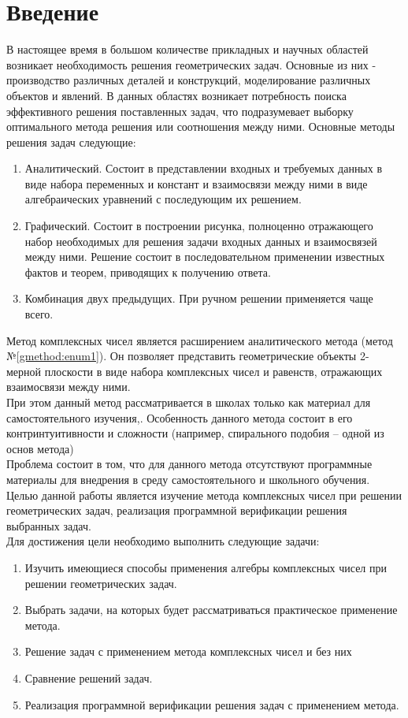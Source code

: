\documentclass[oneside,final,14pt]{extreport}
\newcommand\tcchapter[1]{%
  \chapter*{#1}%
  \addcontentsline{toc}{chapter}{#1}}
\begin{document}

\thispagestyle{empty}
\clearpage

\tableofcontents

\tcchapter{Введение}
В настоящее время в большом количестве прикладных и научных областей возникает необходимость решения геометрических задач.
Основные из них - производство различных деталей и конструкций, моделирование различных объектов и явлений.
В данных областях возникает потребность поиска эффективного решения поставленных задач, что подразумевает выборку оптимального метода решения или соотношения между ними. Основные методы решения задач следующие\cite{geom:methods}:
\begin{enumerate}
    \item Аналитический. Состоит в представлении входных и требуемых данных в виде набора переменных и констант и взаимосвязи между ними в виде алгебраических уравнений с последующим их решением. \label{gmethod:enum1}
    \item Графический. Состоит в построении рисунка, полноценно отражающего набор необходимых для решения задачи входных данных и взаимосвязей между ними. Решение состоит в последовательном применении известных фактов и теорем, приводящих к получению ответа.
    \item Комбинация двух предыдущих. При ручном решении применяется чаще всего.
\end{enumerate}
Метод комплексных чисел является расширением аналитического метода (метод №\ref{gmethod:enum1}).
Он позволяет представить геометрические объекты 2-мерной плоскости в виде набора комплексных чисел и равенств, отражающих взаимосвязи между ними.\\
При этом данный метод рассматривается в школах только как материал для самостоятельного изучения\cite{edu:problem},\cite[стр.6]{book:ponarin}. Особенность данного метода состоит в его контринтуитивности и сложности (например, спирального подобия -- одной из основ метода)\\
Проблема состоит в том, что для данного метода отсутствуют программные материалы для внедрения в среду самостоятельного и школьного обучения.\\
Целью данной работы является изучение метода комплексных чисел при решении геометрических задач, реализация программной верификации решения выбранных задач.\\
Для достижения цели необходимо выполнить следующие задачи:
\begin{enumerate}
    \item Изучить имеющиеся способы применения алгебры комплексных чисел при решении геометрических задач.
    \item Выбрать задачи, на которых будет рассматриваться практическое применение метода.
    \item Решение задач с применением метода комплексных чисел и без них
    \item Сравнение решений задач.
    \item Реализация программной верификации решения задач с применением метода.
\end{enumerate}
\end{document}
